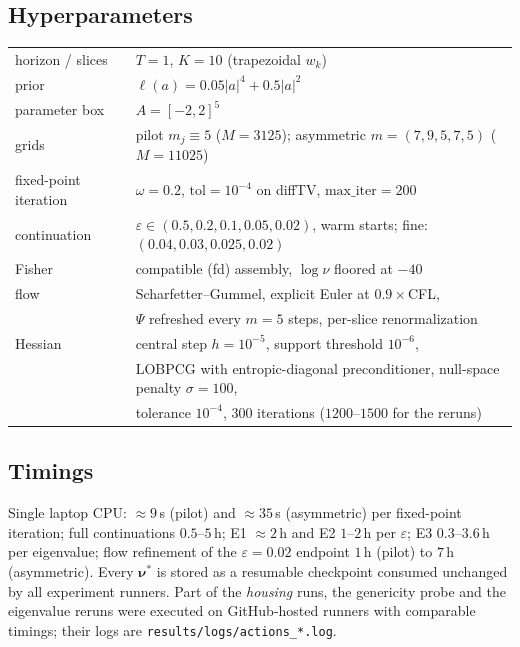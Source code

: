 \documentclass[11pt,leqno]{amsart}
\newcommand{\bnu}{\boldsymbol{\nu}}
\newcommand{\eps}{\varepsilon}
\numberwithin{equation}{section}
\theoremstyle{definition}
\begin{document}
\subsection*{Hyperparameters}
\begin{center}\small
\begin{tabular}{ll}
\toprule
horizon / slices & $T=1$, $K=10$ (trapezoidal $w_k$)\\
prior & $\ell(a)=0.05|a|^4+0.5|a|^2$\\
parameter box & $A=[-2,2]^{5}$\\
grids & pilot $m_j\equiv5$ ($M=3125$); asymmetric $m=(7,9,5,7,5)$ ($M=11025$)\\
fixed-point iteration & $\omega=0.2$, $\mathrm{tol}=10^{-4}$ on diffTV, $\mathrm{max\_iter}=200$\\
continuation & $\eps\in(0.5,0.2,0.1,0.05,0.02)$, warm starts; fine: $(0.04,0.03,0.025,0.02)$\\
Fisher & compatible (fd) assembly, $\log\nu$ floored at $-40$\\
flow & Scharfetter--Gummel, explicit Euler at $0.9\times$CFL,\\
     & $\Psi$ refreshed every $m=5$ steps, per-slice renormalization\\
Hessian & central step $h=10^{-5}$, support threshold $10^{-6}$,\\
        & LOBPCG with entropic-diagonal preconditioner, null-space penalty $\sigma=100$,\\
        & tolerance $10^{-4}$, $300$ iterations ($1200$--$1500$ for the reruns)\\
\bottomrule
\end{tabular}
\end{center}

\subsection*{Timings}
Single laptop CPU: $\approx9$\,s (pilot) and $\approx35$\,s (asymmetric)
per fixed-point iteration; full continuations $0.5$--$5$\,h; E1 $\approx2$\,h
and E2 $1$--$2$\,h per $\eps$; E3 $0.3$--$3.6$\,h per eigenvalue; flow
refinement of the $\eps=0.02$ endpoint $1$\,h (pilot) to $7$\,h
(asymmetric).  Every $\bnu^*$ is stored as a resumable checkpoint consumed
unchanged by all experiment runners.  Part of the \emph{housing} runs, the
genericity probe and the eigenvalue reruns were executed on GitHub-hosted
runners with comparable timings; their logs are
\texttt{results/logs/actions\_*.log}.




\end{document}
